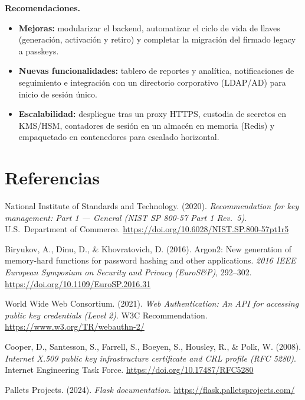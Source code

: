 \documentclass[10pt,letterpaper]{report}
\begin{document}
\textbf{Recomendaciones.}
\begin{itemize}[leftmargin=1.4em,itemsep=2pt,topsep=2pt]
  \item \textbf{Mejoras:} modularizar el backend, automatizar el ciclo de vida
        de llaves (generación, activación y retiro) y completar la migración del
        firmado legacy a passkeys.
  \item \textbf{Nuevas funcionalidades:} tablero de reportes y analítica,
        notificaciones de seguimiento e integración con un directorio
        corporativo (LDAP/AD) para inicio de sesión único.
  \item \textbf{Escalabilidad:} despliegue tras un proxy HTTPS, custodia de
        secretos en KMS/HSM, contadores de sesión en un almacén en memoria
        (Redis) y empaquetado en contenedores para escalado horizontal.
\end{itemize}

\section*{Referencias}
\begin{description}[leftmargin=1.6em,labelindent=0pt,style=unboxed,itemsep=3pt]
  \item National Institute of Standards and Technology. (2020). \emph{Recommendation for key management: Part 1 — General (NIST SP 800-57 Part 1 Rev.\ 5)}. U.S.\ Department of Commerce. \url{https://doi.org/10.6028/NIST.SP.800-57pt1r5}
  \item Biryukov, A., Dinu, D., \& Khovratovich, D. (2016). Argon2: New generation of memory-hard functions for password hashing and other applications. \emph{2016 IEEE European Symposium on Security and Privacy (EuroS\&P)}, 292--302. \url{https://doi.org/10.1109/EuroSP.2016.31}
  \item World Wide Web Consortium. (2021). \emph{Web Authentication: An API for accessing public key credentials (Level 2)}. W3C Recommendation. \url{https://www.w3.org/TR/webauthn-2/}
  \item Cooper, D., Santesson, S., Farrell, S., Boeyen, S., Housley, R., \& Polk, W. (2008). \emph{Internet X.509 public key infrastructure certificate and CRL profile (RFC 5280)}. Internet Engineering Task Force. \url{https://doi.org/10.17487/RFC5280}
  \item Pallets Projects. (2024). \emph{Flask documentation}. \url{https://flask.palletsprojects.com/}
\end{description}
\end{document}
